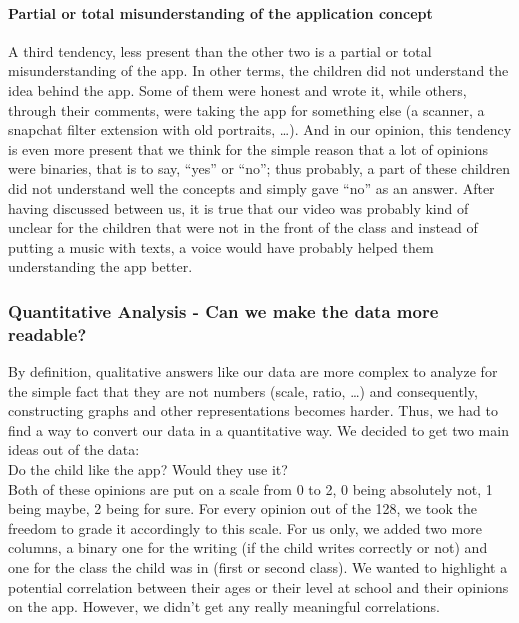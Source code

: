 \documentclass[12pt]{scrartcl}
\begin{document}
				\paragraph{Partial or total misunderstanding of the application concept}
					A third tendency, less present than the other two is a partial or total misunderstanding of the app. In other terms, the children did not understand the idea behind the app. Some of them were honest and wrote it, while others, through their comments, were taking the app for something else (a scanner, a snapchat filter extension with old portraits, …). And in our opinion, this tendency is even more present that we think for the simple reason that a lot of opinions were binaries, that is to say, ``yes'' or ``no''; thus probably, a part of these children did not understand well the concepts and simply gave ``no'' as an answer. After having discussed between us, it is true that our video was probably kind of unclear for the children that were not in the front of the class and instead of putting a music with texts, a voice would have probably helped them understanding the app better.
					
					
		\subsubsection*{Quantitative Analysis - Can we make the data more readable?}

			By definition, qualitative answers like our data are more complex to analyze for the simple fact that they are not numbers (scale, ratio, …) and consequently, constructing graphs and other representations becomes harder. Thus, we had to find a way to convert our data in a quantitative way. We decided to get two main ideas out of the data:\\
			
			Do the child like the app? Would they use it?\\

			Both of these opinions are put on a scale from 0 to 2, 0 being absolutely not, 1 being maybe, 2 being for sure. For every opinion out of the 128, we took the freedom to grade it accordingly to this scale. For us only, we added two more columns, a binary one for the writing (if the child writes correctly or not) and one for the class the child was in (first or second class). We wanted to highlight a potential correlation between their ages or their level at school and their opinions on the app. However, we didn't get any really meaningful correlations. 
\end{document}
